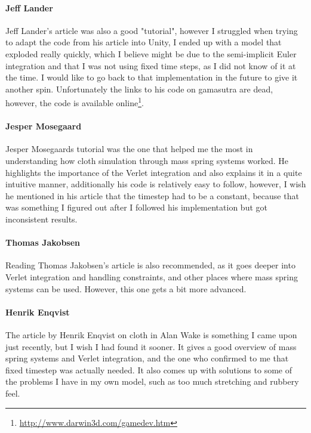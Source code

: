 \paragraph{Jeff Lander} 
Jeff Lander's article was also a good "tutorial", however I struggled when trying to adapt the code from his article\cite{jeff_lander_real_time_cloth} into Unity,
I ended up with a model that exploded really quickly, which I believe might be due to the semi-implicit Euler integration and that I was not using fixed time steps,
as I did not know of it at the time. I would like to go back to that implementation in the future to give it another spin. 
Unfortunately the links to his code on gamasutra are dead, however, the code is available online\footnote{\url{http://www.darwin3d.com/gamedev.htm}}.

\paragraph{Jesper Mosegaard}
Jesper Mosegaards tutorial\cite{mosegaards_clothing_simulation} was the one that helped me the most in understanding how cloth simulation through mass spring systems worked.
He highlights the importance of the Verlet integration and also explains it in a quite intuitive manner, additionally his code
is relatively easy to follow, however, I wish he mentioned in his article that the timestep had to be a constant, because that was something I figured out
after I followed his implementation but got inconsistent results.

\paragraph{Thomas Jakobsen}
Reading Thomas Jakobsen's\cite{jakobsen_advanced_character_physics} article is also recommended, as it goes deeper into Verlet integration and handling constraints,
and other places where mass spring systems can be used. However, this one gets a bit more advanced.

\paragraph{Henrik Enqvist}
The article by Henrik Enqvist\cite{alan_wake_mass_spring} on cloth in Alan Wake is something I came upon just recently, but I wish I had found it sooner.
It gives a good overview of mass spring systems and Verlet integration, and the one who confirmed to me that fixed timestep was actually needed.
It also comes up with solutions to some of the problems I have in my own model, such as too much stretching and rubbery feel.

